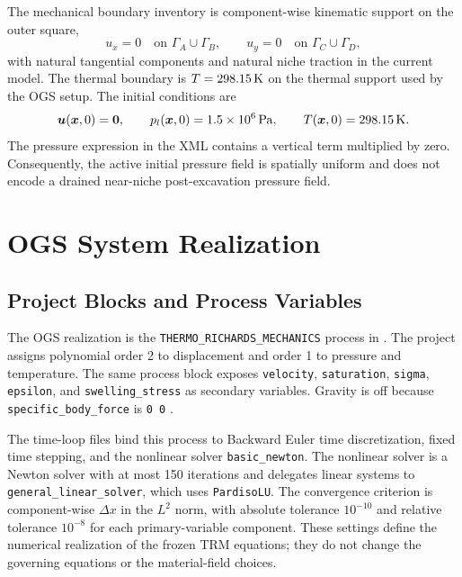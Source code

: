 The mechanical boundary inventory is component-wise kinematic support on the outer
square,
\begin{equation}
  u_x=0 \quad \text{on } \Gamma_A\cup\Gamma_B,
  \qquad
  u_y=0 \quad \text{on } \Gamma_C\cup\Gamma_D,
  \label{eq:mechanical-bc}
\end{equation}
with natural tangential components and natural niche traction in the current model.
The thermal boundary is \(T=298.15\,\mathrm{K}\) on the thermal support used by the
OGS setup.  The initial conditions are
\begin{equation}
  \bm{u}(\bm{x},0)=\bm{0},\qquad
  p_l(\bm{x},0)=1.5\times10^6\,\mathrm{Pa},\qquad
  T(\bm{x},0)=298.15\,\mathrm{K}.
  \label{eq:initial-state}
\end{equation}
The pressure expression in the XML contains a vertical term multiplied by zero.
Consequently, the active initial pressure field is spatially uniform and does not
encode a drained near-niche post-excavation pressure field.

\section{OGS System Realization}
\label{sec:ogs-system}

\subsection{Project Blocks and Process Variables}
\label{sec:ogs-project-blocks}

The OGS realization is the \texttt{THERMO\_RICHARDS\_MECHANICS} process in
.  The project assigns polynomial order 2 to displacement
and order 1 to pressure and temperature.  The same process block exposes
\texttt{velocity}, \texttt{saturation}, \texttt{sigma}, \texttt{epsilon}, and
\texttt{swelling\_stress} as secondary variables.  Gravity is off because
\texttt{specific\_body\_force} is \texttt{0 0}
\citep[``Process variables'']{OpenGeoSysTRMDocs}
\citep[initial and boundary-condition structure]{OpenGeoSysProcessVariablesDocs}.

The time-loop files bind this process to Backward Euler time discretization, fixed
time stepping, and the nonlinear solver \texttt{basic\_newton}.  The nonlinear solver
is a Newton solver with at most 150 iterations and delegates linear systems to
\texttt{general\_linear\_solver}, which uses \texttt{PardisoLU}.  The convergence
criterion is component-wise \(\Delta x\) in the \(L^2\) norm, with absolute tolerance
\(10^{-10}\) and relative tolerance \(10^{-8}\) for each primary-variable component.
These settings define the numerical realization of the frozen TRM equations; they do
not change the governing equations or the material-field choices.

